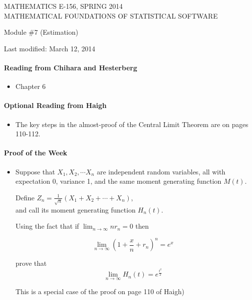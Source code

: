 \documentclass[12pt]{article}
\begin{document}
\begin{center}
MATHEMATICS E-156, SPRING 2014 \\
MATHEMATICAL FOUNDATIONS OF STATISTICAL SOFTWARE

\smallskip

Module \#7 (Estimation)
\end{center}

Last modified: March 12, 2014

\medskip

\paragraph*{Reading from Chihara and Hesterberg}

\begin{itemize}
\item Chapter 6

\end{itemize}

\paragraph*{Optional Reading from Haigh}

\begin{itemize}
\item The key steps in the almost-proof of the Central Limit Theorem are on pages 110-112.
\end{itemize}


\paragraph*{Proof of the Week}
\begin{itemize}
\item Suppose that $X_1, X_2, \cdots X_n$ are independent random variables, all with expectation 0, variance 1, and the same moment generating function $M(t).$

Define $Z_n = \frac{1}{\sqrt{n}}(X_1 + X_2 + \cdots + X_n)$,\\ and call its moment generating function $H_n(t).$

Using the fact that if
$\lim_{n \rightarrow \infty}nr_{n} = 0$ then

$$\lim_{n \rightarrow \infty}(1  + \frac{x}{n} + r_n)^n = e^x$$

prove that 
$$\lim_{n \rightarrow \infty} H_n(t) = e^{\frac{t^2}{2}}$$

This is a special case of the proof on page 110 of Haigh)
\end{itemize}
\end{document}
